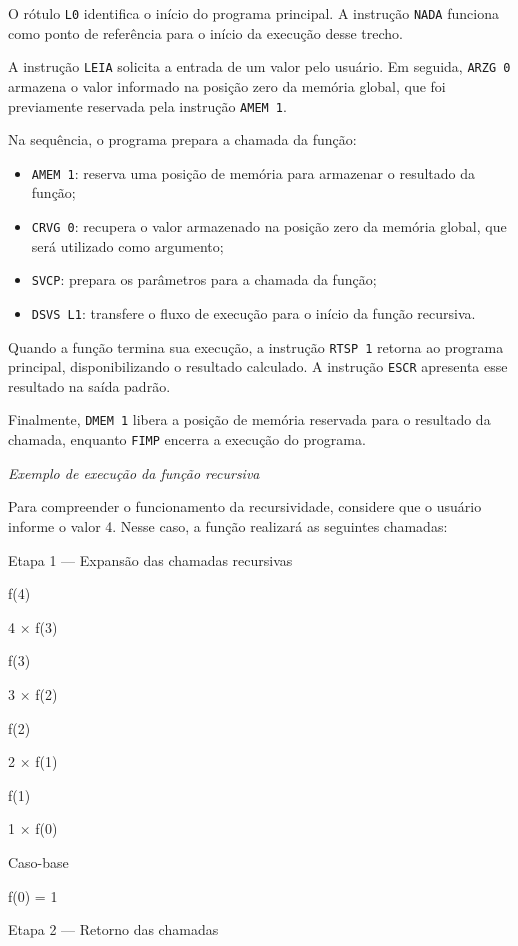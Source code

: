 \documentclass[
  brazilian,
  letterpaper,
]{book}
\providecommand{\tightlist}{%
  \setlength{\itemsep}{0pt}\setlength{\parskip}{0pt}}
\theoremstyle{plain}
\theoremstyle{definition}
\theoremstyle{remark}
\begin{document}
O rótulo \texttt{L0} identifica o início do programa principal. A
instrução \texttt{NADA} funciona como ponto de referência para o início
da execução desse trecho.

A instrução \texttt{LEIA} solicita a entrada de um valor pelo usuário.
Em seguida, \texttt{ARZG\ 0} armazena o valor informado na posição zero
da memória global, que foi previamente reservada pela instrução
\texttt{AMEM\ 1}.

Na sequência, o programa prepara a chamada da função:

\begin{itemize}
\tightlist
\item
  \texttt{AMEM\ 1}: reserva uma posição de memória para armazenar o
  resultado da função;
\item
  \texttt{CRVG\ 0}: recupera o valor armazenado na posição zero da
  memória global, que será utilizado como argumento;
\item
  \texttt{SVCP}: prepara os parâmetros para a chamada da função;
\item
  \texttt{DSVS\ L1}: transfere o fluxo de execução para o início da
  função recursiva.
\end{itemize}

Quando a função termina sua execução, a instrução \texttt{RTSP\ 1}
retorna ao programa principal, disponibilizando o resultado calculado. A
instrução \texttt{ESCR} apresenta esse resultado na saída padrão.

Finalmente, \texttt{DMEM\ 1} libera a posição de memória reservada para
o resultado da chamada, enquanto \texttt{FIMP} encerra a execução do
programa.

\emph{Exemplo de execução da função recursiva}

Para compreender o funcionamento da recursividade, considere que o
usuário informe o valor 4. Nesse caso, a função realizará as seguintes
chamadas:

Etapa 1 --- Expansão das chamadas recursivas

f(4)

4 × f(3)

f(3)

3 × f(2)

f(2)

2 × f(1)

f(1)

1 × f(0)

Caso-base

f(0) = 1

Etapa 2 --- Retorno das chamadas
\end{document}
